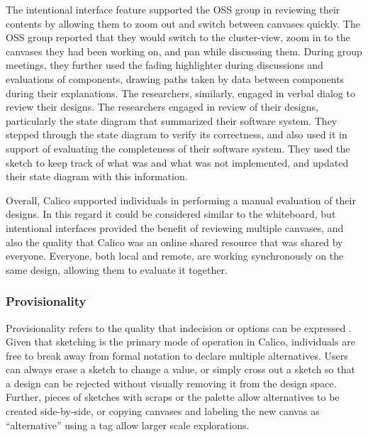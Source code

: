 The intentional interface feature supported the OSS group in reviewing their contents by allowing them to zoom out and switch between canvases quickly. The OSS group reported that they would switch to the cluster-view, zoom in to the canvases they had been working on, and pan while discussing them. During group meetings, they further used the fading highlighter during discussions and evaluations of components, drawing paths taken by data between components during their explanations. The researchers, similarly, engaged in verbal dialog to review their designs. The researchers engaged in review of their designs, particularly the state diagram that summarized their software system. They stepped through the state diagram to verify its correctness, and also used it in support of evaluating the completeness of their software system. They used the sketch to keep track of what was and what was not implemented, and updated their state diagram with this information.

Overall, Calico supported individuals in performing a manual evaluation of their designs. In this regard it could be considered similar to the whiteboard, but intentional interfaces provided the benefit of reviewing multiple canvases, and also the quality that Calico was an online shared resource that was shared by everyone. Everyone, both local and remote, are working synchronously on the same design, allowing them to evaluate it together.


\subsubsection{Provisionality}
Provisionality refers to the quality that indecision or options can be expressed \cite{Petre2013BookChapter}. Given that sketching is the primary mode of operation in Calico, individuals are free to break away from formal notation to declare multiple alternatives. Users can always erase a sketch to change a value, or simply cross out a sketch so that a design can be rejected without visually removing it from the design space. Further, pieces of sketches with scraps or the palette allow alternatives to be created side-by-side, or copying canvases and labeling the new canvas as ``alternative'' using a tag allow larger scale explorations.


